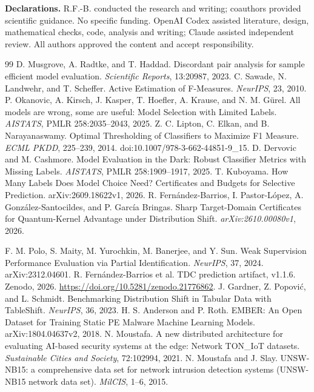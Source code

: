 \documentclass[a4paper]{esannV2}
\begin{document}
\smallskip\noindent\textbf{Declarations.}
R.F.-B. conducted the research and writing; coauthors provided scientific
guidance. No specific funding. OpenAI Codex assisted literature, design,
mathematical checks, code, analysis and writing; Claude assisted independent
review. All authors approved the content and accept responsibility.
\begin{footnotesize}
\begin{thebibliography}{99}
 D. Musgrove, A. Radtke, and T. Haddad.
Discordant pair analysis for sample efficient model evaluation.
\emph{Scientific Reports}, 13:20987, 2023.
 C. Sawade, N. Landwehr, and T. Scheffer.
Active Estimation of F-Measures. \emph{NeurIPS}, 23, 2010.
 P. Okanovic, A. Kirsch, J. Kasper, T. Hoefler,
A. Krause, and N. M. G\"urel.
All models are wrong, some are useful: Model Selection with Limited Labels.
\emph{AISTATS}, PMLR 258:2035--2043, 2025.
 Z. C. Lipton, C. Elkan, and B. Narayanaswamy.
Optimal Thresholding of Classifiers to Maximize F1 Measure.
\emph{ECML PKDD}, 225--239, 2014. doi:10.1007/978-3-662-44851-9\_15.
 D. Dervovic and M. Cashmore.
Model Evaluation in the Dark: Robust Classifier Metrics with Missing Labels.
\emph{AISTATS}, PMLR 258:1909--1917, 2025.
 T. Kuboyama. How Many Labels Does Model Choice Need?
Certificates and Budgets for Selective Prediction. arXiv:2609.18622v1, 2026.
 R. Fern\'andez-Barrios, I. Pastor-L\'opez, A. Gonz\'alez-Santocildes,
and P. Garc\'ia Bringas. Sharp Target-Domain Certificates for Quantum-Kernel
Advantage under Distribution Shift. \emph{arXiv:2610.00080v1}, 2026.

 F. M. Polo, S. Maity, M. Yurochkin, M. Banerjee, and Y. Sun.
Weak Supervision Performance Evaluation via Partial Identification.
\emph{NeurIPS}, 37, 2024. arXiv:2312.04601.
 R. Fern\'andez-Barrios et al.
TDC prediction artifact, v1.1.6. Zenodo, 2026.
\url{https://doi.org/10.5281/zenodo.21776862}.
 J. Gardner, Z. Popovi\'c, and L. Schmidt.
Benchmarking Distribution Shift in Tabular Data with TableShift.
\emph{NeurIPS}, 36, 2023.
 H. S. Anderson and P. Roth. EMBER: An Open Dataset for Training
Static PE Malware Machine Learning Models. arXiv:1804.04637v2, 2018.
 N. Moustafa. A new distributed architecture for evaluating
AI-based security systems at the edge: Network TON\_IoT datasets.
\emph{Sustainable Cities and Society}, 72:102994, 2021.
 N. Moustafa and J. Slay. UNSW-NB15: a comprehensive data set
for network intrusion detection systems (UNSW-NB15 network data set).
\emph{MilCIS}, 1--6, 2015.
\end{thebibliography}
\end{footnotesize}
\end{document}
